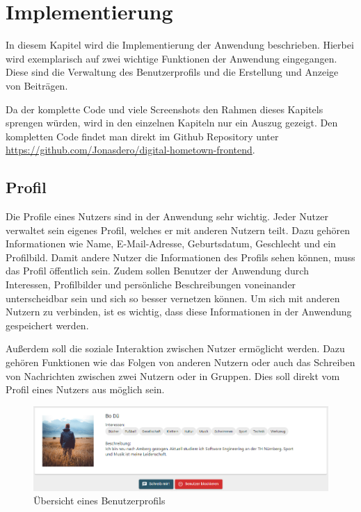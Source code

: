 \chapter{Implementierung}
\label{ch:implementation}

In diesem Kapitel wird die Implementierung der Anwendung beschrieben.
Hierbei wird exemplarisch auf zwei wichtige Funktionen der Anwendung eingegangen.
Diese sind die Verwaltung des Benutzerprofils und die Erstellung und Anzeige von Beiträgen.

Da der komplette Code und viele Screenshots den Rahmen dieses Kapitels sprengen würden, wird in den einzelnen Kapiteln nur ein Auszug gezeigt.
Den kompletten Code findet man direkt im Github Repository unter \url{https://github.com/Jonasdero/digital-hometown-frontend}.

\section{Profil}
\label{sec:profile}

Die Profile eines Nutzers sind in der Anwendung sehr wichtig.
Jeder Nutzer verwaltet sein eigenes Profil, welches er mit anderen Nutzern teilt.
Dazu gehören Informationen wie Name, E-Mail-Adresse, Geburtsdatum, Geschlecht und ein Profilbild.
Damit andere Nutzer die Informationen des Profils sehen können, muss das Profil öffentlich sein.
Zudem sollen Benutzer der Anwendung durch Interessen, Profilbilder und persönliche Beschreibungen voneinander unterscheidbar sein und sich so besser vernetzen können.
Um sich mit anderen Nutzern zu verbinden, ist es wichtig, dass diese Informationen in der Anwendung gespeichert werden.

Außerdem soll die soziale Interaktion zwischen Nutzer ermöglicht werden.
Dazu gehören Funktionen wie das Folgen von anderen Nutzern oder auch das Schreiben von Nachrichten zwischen zwei Nutzern oder in Gruppen.
Dies soll direkt vom Profil eines Nutzers aus möglich sein.

\begin{figure}[ht!]
  \begin{centering}
    \includegraphics[width=1\textwidth]{figures/implementation/profile-header.png}
    \caption{Übersicht eines Benutzerprofils}
    \label{fig:userProfileHeader}
  \end{centering}
\end{figure}

